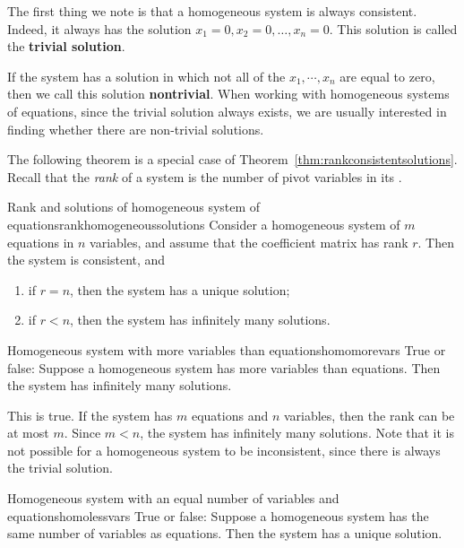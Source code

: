 The first thing we note is that a homogeneous system is always
consistent. Indeed, it always has the solution $x_1=0, x_2=0, \ldots,
x_n=0$. This solution is called the
\textbf{trivial solution}.

If the system has a solution in which not all of the
$x_1, \cdots, x_n$ are equal to zero, then we call this solution
\textbf{nontrivial}.  When working with homogeneous
systems of equations, since the trivial solution always exists, we are
usually interested in finding whether there are non-trivial solutions.

The following theorem is a special case of
Theorem~\ref{thm:rankconsistentsolutions}. Recall that the
{\em rank}
of a system is the number of pivot variables in its {\ef}.

\begin{theorem}{Rank and solutions of homogeneous system of equations}{rankhomogeneoussolutions}
  Consider a homogeneous system of $m$ equations in $n$ variables, and
  assume that the coefficient matrix has rank $r$. Then the system is
  consistent, and 
\begin{enumerate}
\item if $r=n$, then the system has a unique solution;
\item if $r<n$, then the system has infinitely many solutions.
\end{enumerate}
\end{theorem}

\begin{example}{Homogeneous system with more variables than equations}{homomorevars}
  True or false: Suppose a homogeneous system has more variables than
  equations. Then the system has infinitely many solutions.  
\end{example}

\begin{solution}
  This is true. If the system has $m$ equations and $n$ variables,
  then the rank can be at most $m$. Since $m<n$, the system has
  infinitely many solutions. Note that it is not possible for a
  homogeneous system to be inconsistent, since there is always the
  trivial solution.
\end{solution} 

\begin{example}{Homogeneous system with an equal number of variables and equations}{homolessvars}
  True or false: Suppose a homogeneous system has the same number of
  variables as equations. Then the system has a unique solution.
\end{example}

